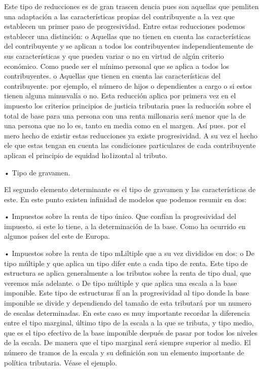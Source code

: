 \documentclass[10pt,a4paper]{article}
\begin{document}
Este tipo de reducciones es de gran trascen dencia pues son aquellas que pemliten una adaptación a las características propias del contribuyente a la vez que establecen un primer paso de progresividad. Entre estas reducciones podemos establecer una distinción:
o Aquellas que no tienen en cuenta las características del contribuyente y se aplican a todos los contribuyentes independientemente de sus características y que pueden variar o no en virtud de algún criterio económico. Como puede ser el mínimo personal que se aplica a todos los contribuyentes.
o Aquellas que tienen en cuenta las características del contribuyente. por ejemplo, el número de hijos o dependientes a cargo o si estos tienen alguna minusvalía o no. Esta reducción aplica por primera vez en el impuesto los criterios principios de justicia tributaria pues la reducción sobre el total de base para una persona con una renta millonaria será menor que la de una persona que no lo es, tanto en media como en el margen. Así pues. por el mero hecho de existir estas reducciones ya existe progresividad. A su vez el hecho ele que estas tengan en cuenta las condiciones particulares de cada contribuyente aplican el principio de equidad ho1izontal al tributo.

• Tipo de gravamen.

El segundo elemento determinante es el tipo de gravamen y las características de este. En este punto existen infinidad de modelos que podemos resumir en dos:

• Impuestos sobre la renta de tipo único. Que confían la progresividad del impuesto. si este lo tiene, a la determinación de la base. Como ha ocurrido en algunos países del este de Europa.

• Impuestos sobre la renta de tipo mLiltiple que a su vez divididos en dos:
o De tipo múltiple y que aplica un tipo difer ente a cada tipo de renta. Este tipo de
estructura se aplica generalmente a los tributos sobre la renta de tipo dual, que
veremos más adelante.
o De tipo múltiple y que aplica una escala a la base imponible. Este tipo de estructuras fí an la progresividad al tipo donde la base imponible se divide y dependiendo del tamaño de esta tributará por un numero de escalas determinadas. En este caso es muy importante recordar la diferencia entre el tipo marginal, último tipo de la escala a la que se tributa, y tipo medio, que es el tipo efectivo de la base imponible después de pasar por todos los niveles de la escala. De manera que el tipo marginal será siempre superior al medio. El número de tramos de la escala y su definición son un elemento importante de política tributaria. Véase el ejemplo.
\end{document}
